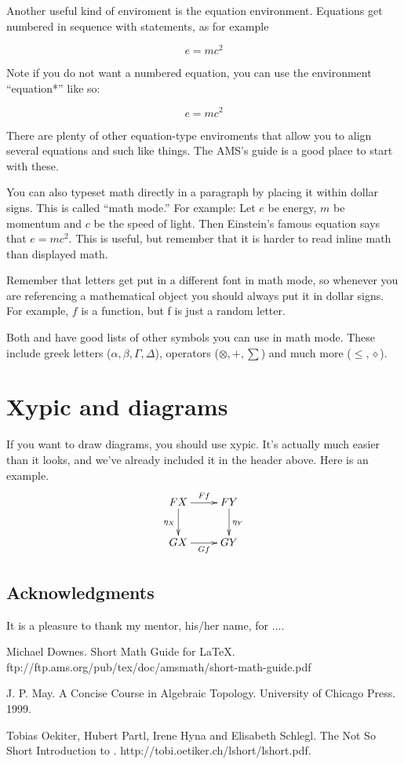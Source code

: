 \documentclass[psamsfonts]{amsart}
\theoremstyle{definition}
\theoremstyle{remark}
\numberwithin{equation}{section}
\begin{document}
Another useful kind of enviroment is the equation environment.  Equations
get numbered in sequence with statements, as for example

\begin{equation}  e = mc^2
\end{equation}

Note if you do not want a numbered equation, you can use the
environment ``equation*''
 like so:

\begin{equation*}
e=mc^2
\end{equation*}

There are plenty of other equation-type enviroments that allow you to
align several equations and such like things. The AMS's guide \cite{amsshort} is a
good place to start with these.

You can also typeset math directly in a paragraph by placing it within
dollar signs.  This is called ``math mode.''  For example: Let $e$
be energy, $m$ be momentum and $c$ be the speed of light.  Then
Einstein's famous equation says that $e=mc^2$.  This is useful, but
remember that it is harder to read inline math than displayed math. 

Remember that letters get put in a different font in math mode, so
whenever you are referencing a mathematical object you should always
put it in dollar signs.  For example, $f$ is a function, but f is just
a random letter.

Both \cite{notsoshort} and \cite{amsshort} have good lists of other symbols you can use in math mode.
These include greek letters ($\alpha, \beta, \Gamma, \Delta$),
operators ($\otimes, +, \sum$) and much more ($\leq, \diamond$).


\section{Xypic and diagrams}

If you want to draw diagrams, you should use xypic.  It's actually
much easier than it looks, and we've already included it in the header
above.  Here is an example. 
\[\xymatrix{
FX \ar[r]^-{Ff} \ar[d]_{\eta_X} & FY \ar[d]^{\eta_Y} \\
GX \ar[r]_-{Gf} & GY\\} \]

\subsection*{Acknowledgments}  It is a pleasure to thank my mentor, 
his/her name, for ....

\begin{thebibliography}{9}

Michael Downes.
Short Math Guide for \LaTeX.
ftp://ftp.ams.org/pub/tex/doc/amsmath/short-math-guide.pdf

J. P. May.
A Concise Course in Algebraic Topology.
University of Chicago Press. 1999. 

Tobias Oekiter, Hubert Partl, Irene Hyna and Elisabeth Schlegl.
The Not So Short Introduction to \LaTeXe.
http://tobi.oetiker.ch/lshort/lshort.pdf.

\end{thebibliography}
\end{document}
